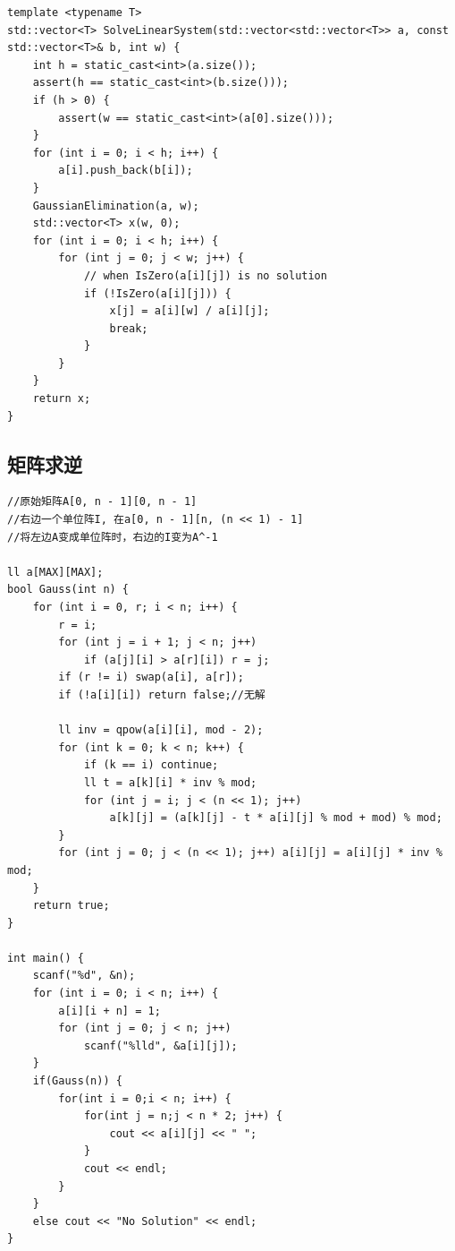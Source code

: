\documentclass[twoside]{article}
\begin{document}
\begin{lstlisting}
template <typename T>
std::vector<T> SolveLinearSystem(std::vector<std::vector<T>> a, const std::vector<T>& b, int w) {
    int h = static_cast<int>(a.size());
    assert(h == static_cast<int>(b.size()));
    if (h > 0) {
        assert(w == static_cast<int>(a[0].size()));
    }
    for (int i = 0; i < h; i++) {
        a[i].push_back(b[i]);
    }
    GaussianElimination(a, w);
    std::vector<T> x(w, 0);
    for (int i = 0; i < h; i++) {
        for (int j = 0; j < w; j++) {
            // when IsZero(a[i][j]) is no solution
            if (!IsZero(a[i][j])) {
                x[j] = a[i][w] / a[i][j];
                break;
            }
        }
    }
    return x;
}\end{lstlisting}
\subsection{矩阵求逆}
\begin{lstlisting}
//原始矩阵A[0, n - 1][0, n - 1]
//右边一个单位阵I, 在a[0, n - 1][n, (n << 1) - 1]
//将左边A变成单位阵时，右边的I变为A^-1

ll a[MAX][MAX];
bool Gauss(int n) {
    for (int i = 0, r; i < n; i++) {
        r = i;
        for (int j = i + 1; j < n; j++)
            if (a[j][i] > a[r][i]) r = j;
        if (r != i) swap(a[i], a[r]);
        if (!a[i][i]) return false;//无解

        ll inv = qpow(a[i][i], mod - 2);
        for (int k = 0; k < n; k++) {
            if (k == i) continue;
            ll t = a[k][i] * inv % mod;
            for (int j = i; j < (n << 1); j++)
                a[k][j] = (a[k][j] - t * a[i][j] % mod + mod) % mod;
        }
        for (int j = 0; j < (n << 1); j++) a[i][j] = a[i][j] * inv % mod;
    }
    return true;
}

int main() {
    scanf("%d", &n);
    for (int i = 0; i < n; i++) {
        a[i][i + n] = 1;
        for (int j = 0; j < n; j++)
            scanf("%lld", &a[i][j]);
    }
    if(Gauss(n)) {
        for(int i = 0;i < n; i++) {
            for(int j = n;j < n * 2; j++) {
                cout << a[i][j] << " ";
            }
            cout << endl;
        }
    }
    else cout << "No Solution" << endl;
}
\end{lstlisting}
\end{document}
